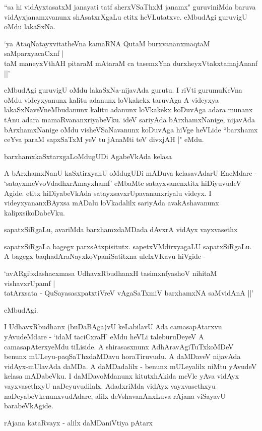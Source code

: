 ``sa hi vidAyxtasatxM janayati tatf sherxVSaThxM janamx" guruviniMda baruva vidAyxjanamxvanunx shAsatxrXgaLu etitx heVLutatxve. eMbudAgi guruvigU oMdu lakaSxNa.

\begin{shloka}
`ya AtaqNatayxvitatheVna kamaRNA QutaM burxvananxmaqtaM saMparxyacaCxnf |\\
taM maneyxVthAH pitaraM mAtaraM ca tasemxYna durxheyxVtakxtamajAnanf ||'
\end{shloka}

eMbudAgi guruvigU oMdu lakaSxNa-nijavAda gurutu. I riVti gurumuKeVna oMdu videyxyanunx kalitu adanunx loVkakekx taruvAga A videyxya lakaSxNaveVneMbudanunx kalitu adanunx loVkakekx koDuvAga adara munanx tAnu adara mamaRvananxriyabeVku. ideV sariyAda bArxhamxNanige, nijavAda bArxhamxNanige oMdu visheVSaNavanunx koDuvAga hiVge heVLide ``barxhamx ceYva paraM sapxSaTxM yeV tu jAnaMti teV divxjAH |" eMdu.

barxhamxkaSxtarxgaLoMdugUDi AgabeVkAda kelasa

A bArxhamxNanU kaSxtirxyanU oMdugUDi mADuva kelasavAdarU EneMdare - `satayxmeVvoVdadhxrAmayxhamf' eMbaMte satayxvanenxtitx hiDiyuvudeV Agide. etitx hiDiyabeVkAda satayxsavxrUpavananxriyalu videyx. I videyxyananxBAyxsa mADalu loVkadalilx sariyAda avakAshavanunx kalipxsikoDabeVku.

sapatxSiRgaLu, avariMda barxhamxdaMDada dAvxrA vidAyx vayxvasethx

sapatxSiRgaLa bagegx parxsAtxpisitutx. sapetxVMdirxyagaLU sapatxSiRgaLu. A bagegx baqhadAraNayxkoVpaniSatitxna ulelxVKavu hiVgide - 

\begin{shloka}
`avARgibxlashacxmasa UdhavxRbudhanxH tasimxnfyashoV nihitaM vishavxrUpamf |\\
tatArxsata - QuSayasasxpatxtiVreV vAgaSaTxmiV barxhamxNA saMvidAnA ||'
\end{shloka} 
eMbudAgi.

I UdhavxRbudhanx (buDaBAga)vU keLabilavU Ada camasapAtarxvu yAvudeMdare - `idaM taciCxraH' eMdu heVLi taleburuDeyeV A camasapAterxyeMdu tiLiside. A shirasasxnunx AdhAravAgiTuTxkoMDeV benunx mULeyu-paqSaThxdaMDavu horaTiruvudu. A daMDaveV nijavAda vidAyx-mUlavAda daMDa. A daMDadalilx - benunx mULeyalilx niMtu yAvudeV kelasa mADabeVku. I daMDavoMdanunx kitutxhAkida meVle yAva vidAyx vayxvasethxyU naDeyuvudilalx. AdadxriMda vidAyx vayxvasethxyu naDeyabeVkenunxvudAdare, alilx deVshavanAnxLuva rAjana viSayavU barabeVkAgide.

rAjana kataRvayx - alilx daMDaniVtiya pAtarx

